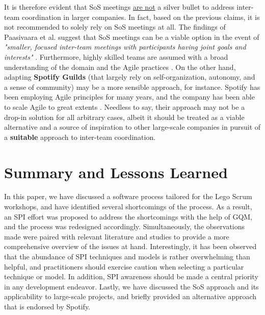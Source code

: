 \documentclass[conference]{IEEEtran}
\begin{document}
It is therefore evident that SoS meetings \underline{are not} a silver bullet
to address inter-team coordination in larger companies. In fact, based on the
previous claims, it is not recommended to solely rely on SoS meetings at all.
The findings of Paasivaara et al. suggest that SoS meetings can be a viable
option in the event of \textit{"smaller, focused inter-team meetings with
participants having joint goals and interests"} \cite{Paasivaara2012}.
Furthermore, highly skilled teams are assumed with a broad understanding of the
domain and the Agile practices \cite{Sutherland2007}. On the other hand,
adapting \textbf{Spotify Guilds} (that largely rely on self-organization,
autonomy, and a sense of community) \cite{Smite2019} may be a more sensible
approach, for instance. Spotify has been employing Agile principles for many
years, and the company has been able to scale Agile to great extents
\cite{Alqudah2016}. Needless to say, their approach may not be a drop-in
solution for all arbitrary cases, albeit it should be treated as a viable
alternative and a source of inspiration to other large-scale companies in
pursuit of a \textbf{suitable} approach to inter-team coordination.

\section{Summary and Lessons Learned}
\label{sec:summary}
In this paper, we have discussed a software process tailored for the Lego Scrum
workshops, and have identified several shortcomings of the process. As a
result, an SPI effort was proposed to address the shortcomings with the help of
GQM, and the process was redesigned accordingly. Simultaneously, the
observations made were paired with relevant literature and studies to provide a
more comprehensive overview of the issues at hand. Interestingly, it has been
observed that the abundance of SPI techniques and models is rather overwhelming
than helpful, and practitioners should exercise caution when selecting a
particular technique or model. In addition, SPI awareness should be made a
central priority in any development endeavor. Lastly, we have discussed the SoS
approach and its applicability to large-scale projects, and briefly provided an
alternative approach that is endorsed by Spotify.


\end{document}
